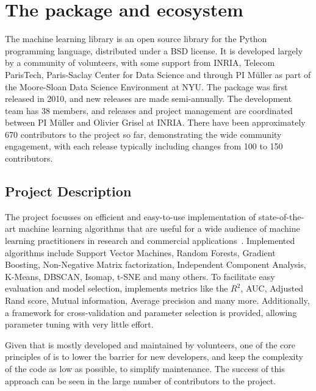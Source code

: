 \section{The \sklearn{} package and ecosystem}
The \sklearn{} machine learning library is an open source library for the
Python programming language, distributed under a BSD license.
It is developed largely by a community of volunteers, with some support from
INRIA, Telecom ParisTech, Paris-Saclay Center for Data Science and through PI
M\"uller as part of the Moore-Sloan Data Science Environment at NYU\@.
The package was first released in 2010, and new releases are made semi-annually.
The development team has 38 members, and releases and project management are
coordinated between PI M\"uller and Olivier Grisel at INRIA\@.
There have been approximately 670 contributors to the project so far, demonstrating
the wide community engagement, with each release typically including changes
from 100 to 150 contributors.

\subsection{Project Description}
The \sklearn{} project focusses on efficient and easy-to-use implementation
of state-of-the-art machine learning algorithms that are useful for a wide
audience of machine learning practitioners in research and commercial
applications~\cite{pedregosa2011scikit, buitinck2013api}.
Implemented algorithms include Support Vector Machines, Random Forests, Gradient Boosting,
Non-Negative Matrix factorization, Independent Component Analysis, K-Means, DBSCAN, Isomap,
t-SNE and many others. To facilitate easy evaluation and model selection, \sklearn{}
implements metrics like the $R^2$, AUC, Adjusted Rand score, Mutual information, Average precision
and many more. Additionally, a framework for cross-validation and parameter selection is
provided, allowing parameter tuning with very little effort.

Given that \sklearn{} is mostly developed and maintained by volunteers,
one of the core principles of \sklearn{} is to lower the barrier for new developers,
and keep the complexity of the code as low as possible, to simplify maintenance.
The success of this approach can be seen in the large number of contributors to
the project.

